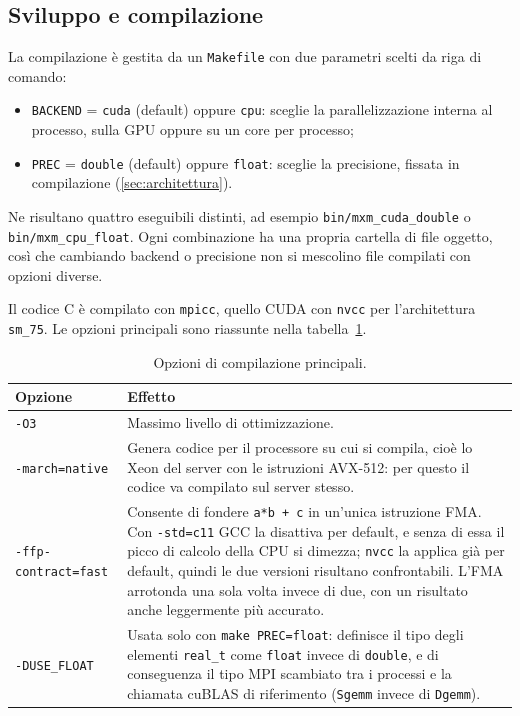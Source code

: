 \documentclass[11pt,a4paper]{article}
\begin{document}
\subsection{Sviluppo e compilazione}\label{sec:compilazione}

La compilazione è gestita da un \texttt{Makefile} con due parametri scelti da
riga di comando:
\begin{itemize}
  \item \texttt{BACKEND} = \texttt{cuda} (default) oppure \texttt{cpu}: sceglie
        la parallelizzazione interna al processo, sulla GPU oppure su un core
        per processo;
  \item \texttt{PREC} = \texttt{double} (default) oppure \texttt{float}: sceglie
        la precisione, fissata in compilazione (\cref{sec:architettura}).
\end{itemize}
Ne risultano quattro eseguibili distinti, ad esempio
\texttt{bin/mxm\_cuda\_double} o \texttt{bin/mxm\_cpu\_float}. Ogni
combinazione ha una propria cartella di file oggetto, così che cambiando
backend o precisione non si mescolino file compilati con opzioni diverse.

Il codice C è compilato con \texttt{mpicc}, quello CUDA con \texttt{nvcc} per
l'architettura \texttt{sm\_75}. Le opzioni principali sono riassunte nella
tabella~\ref{tab:opzioni}.

\begin{table}[H]
  \centering
  \small
  \begin{tabularx}{\textwidth}{@{}lX@{}}
    \toprule
    \textbf{Opzione} & \textbf{Effetto} \\
    \midrule
    \texttt{-O3} & Massimo livello di ottimizzazione. \\
    \addlinespace
    \texttt{-march=native} & Genera codice per il processore su cui si
      compila, cioè lo Xeon del server con le istruzioni AVX-512: per questo
      il codice va compilato sul server stesso. \\
    \addlinespace
    \texttt{-ffp-contract=fast} & Consente di fondere \texttt{a*b + c} in
      un'unica istruzione FMA. Con \texttt{-std=c11} GCC la disattiva per
      default, e senza di essa il picco di calcolo della CPU si dimezza;
      \texttt{nvcc} la applica già per default, quindi le due versioni
      risultano confrontabili. L'FMA arrotonda una sola volta invece di due,
      con un risultato anche leggermente più accurato. \\
    \addlinespace
    \texttt{-DUSE\_FLOAT} & Usata solo con \texttt{make PREC=float}: definisce
      il tipo degli elementi \texttt{real\_t} come \texttt{float} invece di
      \texttt{double}, e di conseguenza il tipo MPI scambiato tra i processi
      e la chiamata cuBLAS di riferimento (\texttt{Sgemm} invece di
      \texttt{Dgemm}). \\
    \bottomrule
  \end{tabularx}
  \caption{Opzioni di compilazione principali.}
  \label{tab:opzioni}
\end{table}
\end{document}
